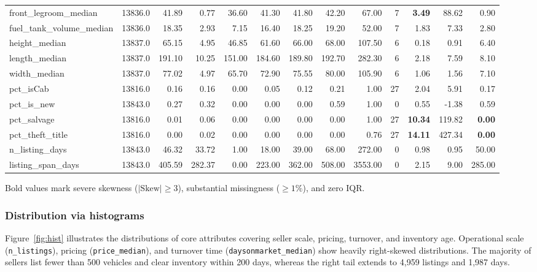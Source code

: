 \documentclass[11pt,a4paper]{article}
\numberwithin{table}{section}
\numberwithin{figure}{section}
\begin{document}
\begin{table}[H]
{\begin{tabular}{lrrrrrrrrrrrr}
    front\_legroom\_median & 13836.0 & 41.89 & 0.77 & 36.60 & 41.30 & 41.80 & 42.20 & 67.00 & 7 & \textbf{3.49} & 88.62 & 0.90 \\
    fuel\_tank\_volume\_median & 13836.0 & 18.35 & 2.93 & 7.15 & 16.40 & 18.25 & 19.20 & 52.00 & 7 & 1.83 & 7.33 & 2.80 \\
    height\_median & 13837.0 & 65.15 & 4.95 & 46.85 & 61.60 & 66.00 & 68.00 & 107.50 & 6 & 0.18 & 0.91 & 6.40 \\
    length\_median & 13837.0 & 191.10 & 10.25 & 151.00 & 184.60 & 189.80 & 192.70 & 282.30 & 6 & 2.18 & 7.59 & 8.10 \\
    width\_median & 13837.0 & 77.02 & 4.97 & 65.70 & 72.90 & 75.55 & 80.00 & 105.90 & 6 & 1.06 & 1.56 & 7.10 \\
    pct\_isCab & 13816.0 & 0.16 & 0.16 & 0.00 & 0.05 & 0.12 & 0.21 & 1.00 & 27 & 2.04 & 5.91 & 0.17 \\
    pct\_is\_new & 13843.0 & 0.27 & 0.32 & 0.00 & 0.00 & 0.00 & 0.59 & 1.00 & 0 & 0.55 & -1.38 & 0.59 \\
    pct\_salvage & 13816.0 & 0.01 & 0.06 & 0.00 & 0.00 & 0.00 & 0.00 & 1.00 & 27 & \textbf{10.34} & 119.82 & \textbf{0.00} \\
    pct\_theft\_title & 13816.0 & 0.00 & 0.02 & 0.00 & 0.00 & 0.00 & 0.00 & 0.76 & 27 & \textbf{14.11} & 427.34 & \textbf{0.00} \\
    n\_listing\_days & 13843.0 & 46.32 & 33.72 & 1.00 & 18.00 & 39.00 & 68.00 & 272.00 & 0 & 0.98 & 0.95 & 50.00 \\
    listing\_span\_days & 13843.0 & 405.59 & 282.37 & 0.00 & 223.00 & 362.00 & 508.00 & 3553.00 & 0 & 2.15 & 9.00 & 285.00 \\
    \bottomrule
  \end{tabular}}
  \par\vspace{2pt}
  {\footnotesize Bold values mark severe skewness ($|\mathrm{Skew}| \ge 3$), substantial missingness ($\ge 1\%$), and zero IQR.}
\end{table}

\subsubsection{Distribution via histograms}
\label{sec:histograms}


Figure~\ref{fig:hist} illustrates the distributions of core attributes covering seller scale, pricing, turnover, and inventory age. Operational scale (\texttt{n\_listings}), pricing (\texttt{price\_median}), and turnover time (\texttt{daysonmarket\_median}) show heavily right-skewed distributions. The majority of sellers list fewer than 500 vehicles and clear inventory within 200 days, whereas the right tail extends to 4,959 listings and 1,987 days.
\end{document}
